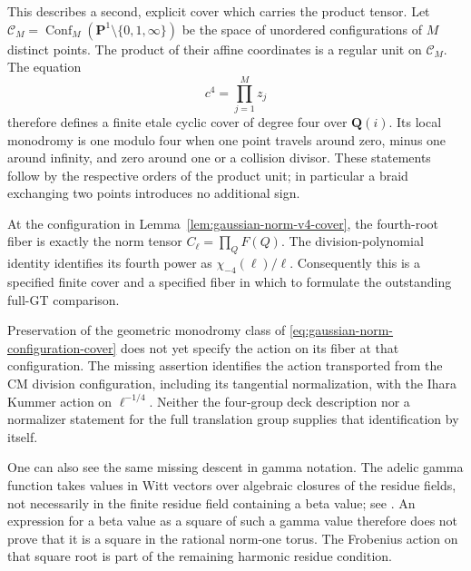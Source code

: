 This describes a second, explicit cover which carries the
product tensor.  Let
\(\mathcal C_M=\operatorname{Conf}_M
(\mathbf P^1\setminus\{0,1,\infty\})\) be the space of
unordered configurations of \(M\) distinct points.
The product of their affine coordinates is a regular unit
on \(\mathcal C_M\).  The equation
\begin{equation}\label{eq:gaussian-norm-configuration-cover}
                     c^4=\prod_{j=1}^{M}z_j
\end{equation}
therefore defines a finite etale cyclic cover of degree
four over \(\mathbf Q(i)\).  Its local monodromy is one
modulo four when one point travels around zero, minus one
around infinity, and zero around one or a collision
divisor.  These statements follow by the respective
orders of the product unit; in particular a braid
exchanging two points introduces no additional sign.

At the configuration in Lemma~\ref{lem:gaussian-norm-v4-cover},
the fourth-root fiber is exactly the norm tensor
\(C_\ell=\prod_Q F(Q)\).  The division-polynomial identity
identifies its fourth power as \(\chi_{-4}(\ell)/\ell\).
Consequently this is a specified finite cover and a
specified fiber in which to formulate the outstanding
full-GT comparison.

Preservation of the geometric monodromy class of
\eqref{eq:gaussian-norm-configuration-cover} does not yet
specify the action on its fiber at that configuration.
The missing assertion identifies the action transported
from the CM division configuration, including its
tangential normalization, with the Ihara Kummer action
on \(\ell^{-1/4}\).  Neither the four-group deck description
nor a normalizer statement for the full translation
group supplies that identification by itself.

One can also see the same missing descent in gamma
notation.  The adelic gamma function takes values in
Witt vectors over algebraic closures of the residue
fields, not necessarily in the finite residue field
containing a beta value; see
\cite[\S2.3, p.~101]{Furusho2003}.
An expression for a beta value as a square of such a
gamma value therefore does not prove that it is a square
in the rational norm-one torus.  The Frobenius action on
that square root is part of the remaining harmonic
residue condition.
